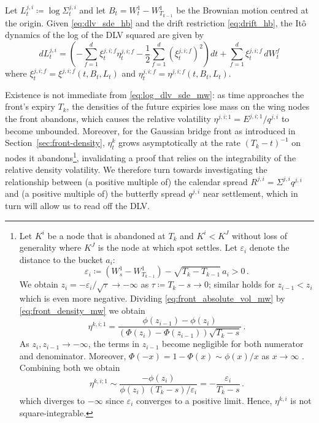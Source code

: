 \documentclass[11pt]{article}
\theoremstyle{plain}
\theoremstyle{definition}
\theoremstyle{remark}
\begin{document}
Let $L_t^{j,i}\coloneqq\log\Sigma_t^{j,i}$ and let $B_t = W_t^1 - W_{T_{k-1}}^1$ be the Brownian motion centred at the origin. Given \eqref{eq:dlv_sde_hb} and the drift restriction \eqref{eq:drift_hb}, the It\^o dynamics of the log of the DLV squared are given by 
\begin{equation}
  \label{eq:log_dlv_sde_mw}
  dL_t^{j,i}=\left(-\sum_{f=1}^d\xi_t^{j,i;f}\eta_t^{j,i;f}
    -\frac12\sum_{f=1}^d(\xi_t^{j,i;f})^2\right)dt+\sum_{f=1}^d\xi_t^{j,i;f}\,dW_t^f 
\end{equation}
where $\xi_t^{j,i;f} = \xi^{j,i;f}(t, B_t, L_t)$ and $\eta_t^{j,i;f} = \eta^{j,i;f}(t, B_t, L_t)$.

Existence is not immediate from \eqref{eq:log_dlv_sde_mw}: as time approaches the front's expiry $T_k$, the densities of the future expiries lose mass on the wing nodes the front abandons, which causes the relative volatility $\eta^{j, i; 1} = E^{j, i; 1} / q^{j, i}$ to become unbounded. 
Moreover, for the Gaussian bridge front as introduced in Section~\ref{sec:front-density}, $\eta_t^{k}$ grows asymptotically at the rate $(T_k - t)^{-1}$ on nodes it abandons\footnote{
Let $K^i$ be a node that is abandoned at $T_k$ and $K^i < K^J$ without loss of generality where $K^J$ is the node at which spot settles. Let $\varepsilon_i$ denote the distance to the bucket $a_i$: 
$$ \varepsilon_i \coloneqq (W^1_s - W^1_{T_{k-1}}) - \sqrt{T_k - T_{k-1}} \, a_i > 0 \, . $$ 
We obtain $z_i = -\varepsilon_i / \sqrt{\tau}\to -\infty$ as $\tau \coloneqq T_k - s \to 0$; similar holds for $z_{i-1} < z_i$ which is even more negative. 
Dividing \eqref{eq:front_absolute_vol_mw} by \eqref{eq:front_density_mw} we obtain 
\begin{equation*}
  \eta^{k, i; 1} = \dfrac{\phi(z_{i-1}) - \phi(z_i)}{(\Phi(z_i) - \Phi(z_{i-1}))  \sqrt{T_k - s}} \, . 
\end{equation*}
As $z_i, z_{i-1} \to - \infty$, the terms in $z_{i-1}$ become negligible for both numerator and denominator. Moreover, $\Phi(-x) = 1-\Phi(x) \sim \phi(x)/x$ as $x \to \infty$ 
\citep[Ch.~VII, Lemma~2, p.~175]{feller-vol-1}. Combining both we obtain 
\begin{equation*}
  \eta^{k, i; 1} \sim \frac{-\phi(z_i)}{\phi(z_i)\,(T_k-s)/\varepsilon_i} = -\frac{\varepsilon_i}{T_k - s} \, . 
\end{equation*}
which diverges to $-\infty$ since $\varepsilon_i$ converges to a positive limit. Hence, $\eta^{k,i}$ is not square-integrable. 
}, invalidating a proof that relies on the integrability of the relative density volatility. We therefore turn towards investigating the relationship between (a positive multiple of) the calendar spread $R^{j, i} = \Sigma^{j, i} q^{j, i}$ and (a positive multiple of) the butterfly spread $q^{j, i}$ near settlement, which in turn will allow us to read off the DLV. 
\end{document}
